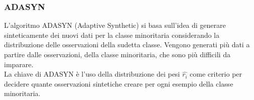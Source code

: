 \documentclass[italian,12pt,a4paper]{article}
\begin{document}
	\begin{figure}[!ht]
		\centering
	\end{figure}
	\subsubsection{ADASYN}
	L'algoritmo ADASYN (Adaptive Synthetic) si basa sull'idea di generare sinteticamente dei nuovi dati per la classe minoritaria considerando la distribuzione delle osservazioni della sudetta classe. Vengono generati più dati a partire dalle osservazioni, della classe minoritaria, che sono più difficili da imparare. \\
	La chiave di ADASYN è l'uso della distribuzione dei pesi $\hat{r_i}$ come criterio per decidere quante osservazioni sintetiche creare per ogni esempio della classe minoritaria.
	
\end{document}
